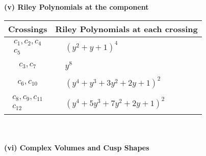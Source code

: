 \documentclass[1p]{elsarticle_modified}
\theoremstyle{definition}
\begin{document}
\newpage\renewcommand{\arraystretch}{1}
\flushleft \textbf{(v) Riley Polynomials at the component}\newline \\
\begin{tabular}{m{50pt}|m{274pt}}
Crossings & \hspace{64pt}Riley Polynomials at each crossing \\
\hline $$\begin{aligned}c_{1},c_{2},c_{4}\\c_{5}\end{aligned}$$&$\begin{aligned}
&(y^2+y+1)^4
\end{aligned}$\\
\hline $$\begin{aligned}c_{3},c_{7}\end{aligned}$$&$\begin{aligned}
&y^8
\end{aligned}$\\
\hline $$\begin{aligned}c_{6},c_{10}\end{aligned}$$&$\begin{aligned}
&(y^4+y^3+3 y^2+2 y+1)^2
\end{aligned}$\\
\hline $$\begin{aligned}c_{8},c_{9},c_{11}\\c_{12}\end{aligned}$$&$\begin{aligned}
&(y^4+5 y^3+7 y^2+2 y+1)^2
\end{aligned}$\\
\hline
\end{tabular}\\~\\
\newpage\flushleft \textbf{(vi) Complex Volumes and Cusp Shapes}
\end{document}
